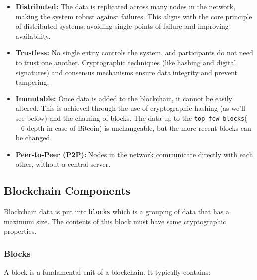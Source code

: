 \begin{itemize}[itemsep=1pt, topsep=2pt]
    \item \textbf{Distributed:} The data is replicated across many nodes in the network, making the system robust against failures.  This aligns with the core principle of distributed systems:  avoiding single points of failure and improving availability.
    \item \textbf{Trustless:}  No single entity controls the system, and participants do not need to trust one another.  Cryptographic techniques (like hashing and digital signatures) and consensus mechanisms ensure data integrity and prevent tampering.
    \item \textbf{Immutable:} Once data is added to the blockchain, it cannot be easily altered.  This is achieved through the use of cryptographic hashing (as we'll see below) and the chaining of blocks. The data up to the \texttt{top few blocks}($-6$ depth in case of Bitcoin) is unchangeable, but the more recent blocks can be changed.
    \item \textbf{Peer-to-Peer (P2P):}  Nodes in the network communicate directly with each other, without a central server.
\end{itemize}

\subsection{Blockchain Components}
Blockchain data is put into \texttt{blocks} which is a grouping of data that has a maximum size. The contents of this block must have some cryptographic properties.

\subsubsection{Blocks}

A block is a fundamental unit of a blockchain. It typically contains:

